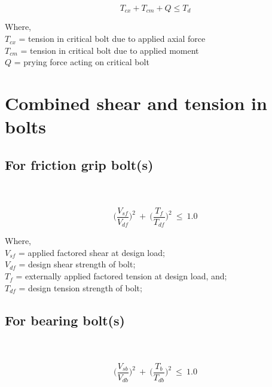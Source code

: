 \documentclass[11.5pt,a4paper,oneside]{report}
\begin{document}
\begin{Form}
\begin{equation}
	T_{cx} + T_{cm} + Q \le T_d
\end{equation}

Where, \\
\indent $T_{cx}$ = tension in critical bolt due to applied axial force \\
\indent $T_{cm}$ = tension in critical bolt due to applied moment \\
\indent $Q$ = prying force acting on critical bolt \\

\section{Combined shear and tension in bolts}
\subsection{For friction grip bolt(s)}
\qquad \qquad [Reference: Cl. 10.4.6, IS 800:2007] \\ \\

\begin{equation}
	\bigg(\frac{V_{sf}}{V_{df}}\bigg)^{2} ~ + ~ \bigg(\frac{T_{f}}{T_{df}}\bigg)^{2} ~ \leq ~ 1.0
\end{equation}

Where, \\
\indent $V_{sf}$ = applied factored shear at design load; \\
\indent $V_{df}$ = design shear strength of bolt; \\
\indent $T_f$ = externally applied factored tension at design load, and; \\
\indent $T_{df}$ = design tension strength of bolt; \\


\subsection{For bearing bolt(s)}
\qquad \qquad [Reference: Cl. 10.3.6, IS 800:2007] \\ \\

\begin{equation}
	\bigg(\frac{V_{sb}}{V_{db}}\bigg)^{2} ~ + ~ \bigg(\frac{T_{b}}{T_{db}}\bigg)^{2} ~ \leq ~ 1.0
\end{equation}


\end{Form}
\end{document}
